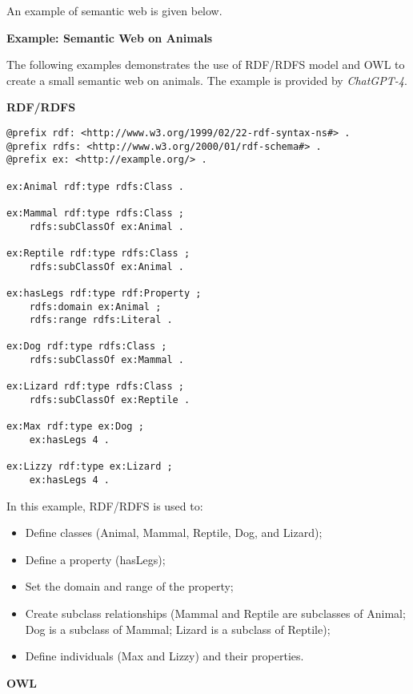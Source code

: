 An example of semantic web is given below.
\begin{mdframed}

\vspace{0.1in}
{\centering \textbf{Example: Semantic Web on Animals}}
\vspace{0.1in}

The following examples demonstrates the use of RDF/RDFS model and OWL to create a small semantic web on animals. The example is provided by \textit{ChatGPT-4}.

\vspace{0.1in}
\noindent \textbf{RDF/RDFS}
\vspace{0.1in}

\begin{lstlisting}
@prefix rdf: <http://www.w3.org/1999/02/22-rdf-syntax-ns#> .
@prefix rdfs: <http://www.w3.org/2000/01/rdf-schema#> .
@prefix ex: <http://example.org/> .

ex:Animal rdf:type rdfs:Class .

ex:Mammal rdf:type rdfs:Class ;
    rdfs:subClassOf ex:Animal .

ex:Reptile rdf:type rdfs:Class ;
    rdfs:subClassOf ex:Animal .

ex:hasLegs rdf:type rdf:Property ;
    rdfs:domain ex:Animal ;
    rdfs:range rdfs:Literal .

ex:Dog rdf:type rdfs:Class ;
    rdfs:subClassOf ex:Mammal .

ex:Lizard rdf:type rdfs:Class ;
    rdfs:subClassOf ex:Reptile .

ex:Max rdf:type ex:Dog ;
    ex:hasLegs 4 .

ex:Lizzy rdf:type ex:Lizard ;
    ex:hasLegs 4 .
\end{lstlisting}

In this example, RDF/RDFS is used to:
\begin{itemize}
  \item Define classes (Animal, Mammal, Reptile, Dog, and Lizard);
  \item Define a property (hasLegs);
  \item Set the domain and range of the property;
  \item Create subclass relationships (Mammal and Reptile are subclasses of Animal; Dog is a subclass of Mammal; Lizard is a subclass of Reptile);
  \item Define individuals (Max and Lizzy) and their properties.
\end{itemize}

\vspace{0.1in}
\noindent \textbf{OWL}
\vspace{0.1in}


\end{mdframed}
